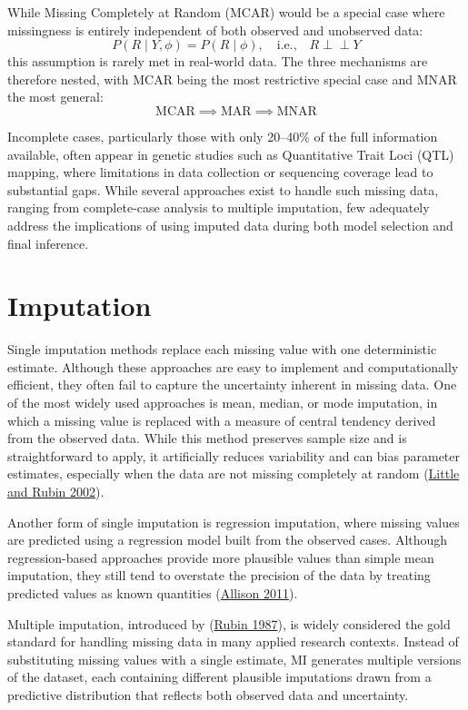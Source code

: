 \documentclass[
  12pt,
]{article}
\begin{document}
While Missing Completely at Random (MCAR) would be a special case where
missingness is entirely independent of both observed and unobserved data:
\[
P(R \mid Y, \phi) = P(R \mid
\phi), \quad \text{i.e.,} \quad
R \perp\!\!\!\perp Y
\]
this assumption is rarely met in real-world data. The three mechanisms are
therefore nested, with MCAR being the most restrictive special case and MNAR
the most general:
\[
\text{MCAR} \implies \text{MAR} \implies \text{MNAR}
\]

Incomplete cases, particularly those with only 20--40\% of the full
information available, often appear in genetic studies such as
Quantitative Trait Loci (QTL) mapping, where limitations in data collection
or sequencing coverage lead to substantial gaps. While several approaches
exist to handle such missing data, ranging from complete-case analysis to multiple
imputation, few adequately address the implications of using imputed data
during both model selection and final inference.

\section{Imputation}

Single imputation methods replace each missing value with one
deterministic estimate. Although these approaches are easy to implement
and computationally efficient, they often fail to capture the
uncertainty inherent in missing data. One of the most widely used
approaches is mean, median, or mode imputation, in which a missing value
is replaced with a measure of central tendency derived from the observed
data. While this method preserves sample size and is straightforward to
apply, it artificially reduces variability and can bias parameter
estimates, especially when the data are not missing completely at random
(\protect\hyperlink{ref-little2002statistical}{Little and Rubin 2002}).

Another form of single imputation is regression imputation, where
missing values are predicted using a regression model built from the
observed cases. Although regression-based approaches provide more
plausible values than simple mean imputation, they still tend to
overstate the precision of the data by treating predicted values as
known quantities (\protect\hyperlink{ref-Allison2011}{Allison 2011}).

Multiple imputation, introduced by
(\protect\hyperlink{ref-rubin1987multiple}{Rubin 1987}), is widely
considered the gold standard for handling missing data in many applied
research contexts. Instead of substituting missing values with a single
estimate, MI generates multiple versions of the dataset, each containing
different plausible imputations drawn from a predictive distribution
that reflects both observed data and uncertainty.
\end{document}

